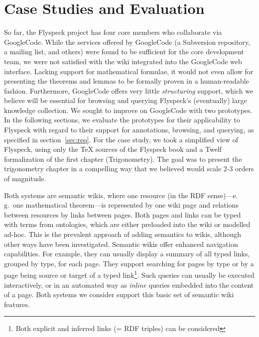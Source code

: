 \section{Case Studies and Evaluation}

So far, the Flyspeck project has four core members who collaborate via
GoogleCode\cite{website:FlyspeckProjectPage}.  While the services offered by
GoogleCode (a Subversion repository, a mailing list, and others) were
found to be sufficient for the core development team, we were not
satisfied with the wiki integrated into the GoogleCode web interface.
Lacking support for mathematical formulae, it would not even allow for
presenting the theorems and lemmas to be formally proven in a
human-readable fashion.  Furthermore, GoogleCode offers very
little \emph{structuring} support, which we believe will be
essential for browsing and querying Flyspeck's 
(eventually) large knowledge collection.  We sought to improve
on GoogleCode with two prototypes.  
In the following sections, we evaluate the prototypes 
for their applicability to Flyspeck with regard to their
support for annotations, browsing, and querying, as specified in
section~\ref{sec:req}.  For the case study, we took a simplified 
view of Flyspeck, using only the {\TeX} sources of the
Flyspeck book and a Twelf formalization of the first chapter (Trigonometry).
The goal was to present the trigonometry chapter in a compelling way
that we believed would scale 2-3 orders of magnitude.  

Both systems are semantic wikis, where one resource (in the RDF sense)---e.\,g.\
one mathematical theorem---is represented by one wiki page and relations between
resources by links between pages.  Both pages and links can be typed with terms
from ontologies\cite{OrDeMoVoHa06:annotation-navigation-semwiki}, which are
either preloaded into the wiki or modelled
ad-hoc\cite{KrSchVr:semwiki-reasoning07}.  This is the prevalent approach of
adding semantics to wikis, although other ways have been
investigated\cite{semwiki06}.  Semantic wikis offer enhanced navigation
capabilities.  For example, they can usually display a summary of all typed
links, grouped by type, for each page.  They support searching for pages by type
or by a page being source or target of a typed link\footnote{Both explicit and
  inferred links (= RDF triples) can be
  considered\cite{KrSchVr:semwiki-reasoning07}}.  Such queries can usually be
executed interactively, or in an automated way as \emph{inline} queries embedded
into the content of a page\cite{KrSchVr:semwiki-reasoning07}.  Both systems we
consider support this basic set of semantic wiki features.

